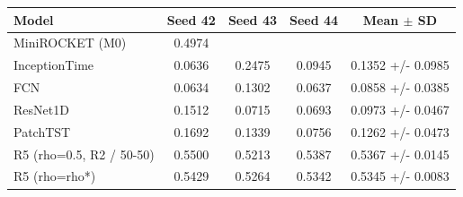 \begin{tabular}{lcccc}
\toprule
Model & Seed 42 & Seed 43 & Seed 44 & Mean $\pm$ SD \\
\midrule
MiniROCKET (M0) & 0.4974 &  &  &  \\
InceptionTime & 0.0636 & 0.2475 & 0.0945 & 0.1352 +/- 0.0985 \\
FCN & 0.0634 & 0.1302 & 0.0637 & 0.0858 +/- 0.0385 \\
ResNet1D & 0.1512 & 0.0715 & 0.0693 & 0.0973 +/- 0.0467 \\
PatchTST & 0.1692 & 0.1339 & 0.0756 & 0.1262 +/- 0.0473 \\
R5 (rho=0.5, R2 / 50-50) & 0.5500 & 0.5213 & 0.5387 & 0.5367 +/- 0.0145 \\
R5 (rho=rho*) & 0.5429 & 0.5264 & 0.5342 & 0.5345 +/- 0.0083 \\
\bottomrule
\end{tabular}
